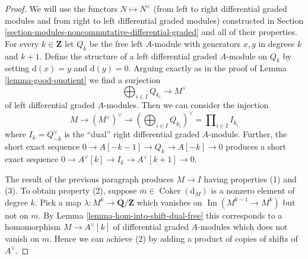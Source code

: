 \documentclass[10pt,a4paper]{amsart}
\theoremstyle{plain}
\theoremstyle{definition}
\theoremstyle{remark}
\numberwithin{equation}{subsection}
\def\Im{\mathop{\mathrm{Im}}}
\def\Coker{\mathop{\mathrm{Coker}}}
\begin{document}
\begin{proof}
We will use the functors $N \mapsto N^\vee$ (from left to right
differential graded modules and from right to left differential
graded modules) constructed in
Section \ref{section-modules-noncommutative-differential-graded}
and all of their properties.
For every $k \in \mathbf{Z}$ let $Q_k$ be the free left $A$-module with
generators $x, y$ in degrees $k$ and $k + 1$. Define the structure of a
left differential graded $A$-module on $Q_k$ by setting $\text{d}(x) = y$
and $\text{d}(y) = 0$. Arguing exactly as in the proof of
Lemma \ref{lemma-good-quotient} we find a surjection
$$
\bigoplus\nolimits_{i \in I} Q_{k_i} \longrightarrow M^\vee
$$
of left differential graded $A$-modules. Then we can consider the injection
$$
M \to (M^\vee)^\vee \to (\bigoplus\nolimits_{i \in I} Q_{k_i})^\vee =
\prod\nolimits_{i \in I} I_{k_i}
$$
where $I_k = Q_{-k}^\vee$ is the ``dual'' right differential graded $A$-module.
Further, the short exact sequence $0 \to A[-k - 1] \to Q_k \to A[-k] \to 0$
produces a short exact sequence
$0 \to A^\vee[k] \to I_k \to A^\vee[k + 1] \to 0$.

\medskip\noindent
The result of the previous paragraph produces $M \to I$
having properties (1) and (3). To obtain property (2), suppose
$\overline{m} \in \Coker(\text{d}_M)$ is a nonzero element of
degree $k$. Pick a map $\lambda : M^k \to \mathbf{Q}/\mathbf{Z}$
which vanishes on $\Im(M^{k - 1} \to M^k)$ but not on $m$. By
Lemma \ref{lemma-hom-into-shift-dual-free}
this corresponds to a homomorphism $M \to A^\vee[k]$ of
differential graded $A$-modules which does not vanish on $m$.
Hence we can achieve (2) by adding
a product of copies of shifts of $A^\vee$.
\end{proof}
\end{document}
